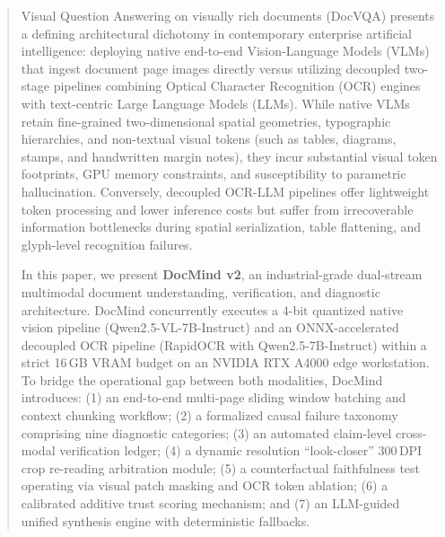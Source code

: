 \documentclass[conference]{IEEEtran}
\begin{document}
\maketitle

\begin{abstract}
Visual Question Answering on visually rich documents (DocVQA) presents a defining architectural dichotomy in contemporary enterprise artificial intelligence: deploying native end-to-end Vision-Language Models (VLMs) that ingest document page images directly versus utilizing decoupled two-stage pipelines combining Optical Character Recognition (OCR) engines with text-centric Large Language Models (LLMs). While native VLMs retain fine-grained two-dimensional spatial geometries, typographic hierarchies, and non-textual visual tokens (such as tables, diagrams, stamps, and handwritten margin notes), they incur substantial visual token footprints, GPU memory constraints, and susceptibility to parametric hallucination. Conversely, decoupled OCR-LLM pipelines offer lightweight token processing and lower inference costs but suffer from irrecoverable information bottlenecks during spatial serialization, table flattening, and glyph-level recognition failures.

In this paper, we present \textbf{DocMind v2}, an industrial-grade dual-stream multimodal document understanding, verification, and diagnostic architecture. DocMind concurrently executes a 4-bit quantized native vision pipeline (Qwen2.5-VL-7B-Instruct) and an ONNX-accelerated decoupled OCR pipeline (RapidOCR with Qwen2.5-7B-Instruct) within a strict 16\,GB VRAM budget on an NVIDIA RTX A4000 edge workstation. To bridge the operational gap between both modalities, DocMind introduces: (1) an end-to-end multi-page sliding window batching and context chunking workflow; (2) a formalized causal failure taxonomy comprising nine diagnostic categories; (3) an automated claim-level cross-modal verification ledger; (4) a dynamic resolution ``look-closer'' 300\,DPI crop re-reading arbitration module; (5) a counterfactual faithfulness test operating via visual patch masking and OCR token ablation; (6) a calibrated additive trust scoring mechanism; and (7) an LLM-guided unified synthesis engine with deterministic fallbacks.


\end{abstract}
\end{document}
